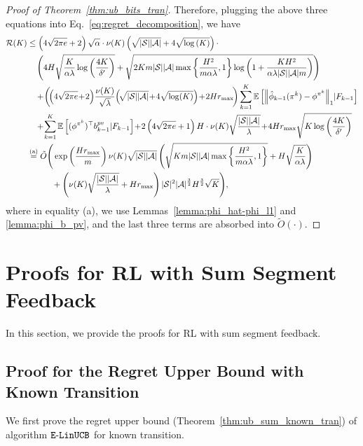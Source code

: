 \begin{proof}[Proof of Theorem~\ref{thm:ub_bits_tran}]
	Therefore, plugging the above three equations into Eq.~\eqref{eq:regret_decomposition}, we have
	\begin{align*}
	\cR(K) &\leq \sbr{4\sqrt{2\pi e} + 2} \sqrt{\alpha} \cdot \nu(K) \sbr{ \sqrt{|\cS||\cA|} + 4 \sqrt{\log\sbr{K}} } \cdot 
		\\
		&\quad \sbr{ 4H\sqrt{ \frac{K}{\alpha \lambda} \log\sbr{\frac{4K}{\delta'}} } + \sqrt{ 2Km |\cS| |\cA| \max\lbr{ \frac{H^2}{m \alpha \lambda}, 1} \log \sbr{ 1+ \frac{  KH^2 }{ \alpha \lambda |\cS| |\cA| m } } }  }
		\\
		&\quad 
		+\! \sbr{\!\sbr{4\sqrt{2\pi e} \!+\! 2}\!   \frac{\nu(K)}{\sqrt{\lambda}}\! \sbr{\! \sqrt{|\cS||\cA|} \!+\! 4 \sqrt{ \log(K) } } \!+\! 2Hr_{\max} \!} \sum_{k=1}^{K} \ex\mbr{ \nbr{ \hat{\phi}_{k-1}(\pi^k) - \phi^{\pi^k} }_1 \!| F_{k-1} }  
		\\
		&\quad +\! \sum_{k=1}^{K} \ex\mbr{ (\phi^{\pi^k})^\top b^{pv}_{k-1} | F_{k-1} } 
		\!+\! 2 \sbr{4\sqrt{2\pi e} + 1} H \cdot \nu(K)  \sqrt{ \frac{|\cS| |\cA|}{\lambda} }  \!+\! 4 H r_{\max} \sqrt{ K \log\sbr{\frac{4K}{\delta'}} } 
		\\
		&\overset{\textup{(a)}}{=} \tilde{O} \Bigg( \exp\sbr{\frac{Hr_{\max}}{m}} \nu(K) \sqrt{|\cS||\cA|} \sbr{ \sqrt{ Km |\cS| |\cA| \max\lbr{ \frac{H^2}{m \alpha \lambda}, 1}  } + H\sqrt{ \frac{K}{\alpha \lambda} }  }
		\\
		&\qquad \quad
		+ \sbr{ \nu(K) \sqrt{ \frac{|\cS||\cA|}{\lambda} }  + Hr_{\max} } |\cS|^2 |\cA|^{\frac{3}{2}} H^{\frac{3}{2}}  \sqrt{ K }
		\Bigg) ,
	\end{align*}
	where in equality (a), we use Lemmas~\ref{lemma:phi_hat-phi_l1} and \ref{lemma:phi_b_pv}, and the last three terms are absorbed into $\tilde{O}(\cdot)$.
\end{proof}

\section{Proofs for RL with Sum Segment Feedback}

In this section, we provide the proofs for RL with sum segment feedback.

\subsection{Proof for the Regret Upper Bound with Known Transition}

We first prove the regret upper bound (Theorem~\ref{thm:ub_sum_known_tran}) of algorithm $\mathtt{E\mbox{-}LinUCB}$ for known transition.

